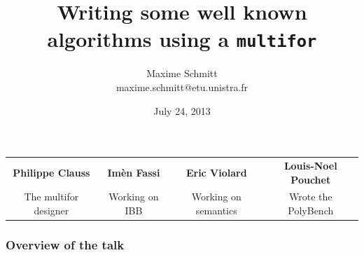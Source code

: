 \documentclass{beamer}
\title[From C loop nest to \texttt{multifor} loop nest]{Writing some well known algorithms using a \texttt{multifor}
}
\author[Maxime Schmitt]{Maxime Schmitt \\ \scriptsize{maxime.schmitt@etu.unistra.fr}
}
\date{July 24, 2013}
\institute[ICube]{
    Department of Informatics \\
        ICube laboratories \\
        University of Strasbourg
}
\begin{document}

\begin{frame}
\titlepage{}

\tiny{
\begin{tabular}{|c|c|c|c|}
\hline
\bf{Philippe Clauss} & \bf{Imèn Fassi} & \bf{Eric Violard} & \bf{Louis-Noel Pouchet}\\
The multifor designer & Working on IBB & Working on semantics & Wrote the PolyBench \\
\hline
\end{tabular}
}
\end{frame}


\begin{frame}
\frametitle{Overview of the talk}
\tableofcontents{}
\end{frame}
\end{document}
